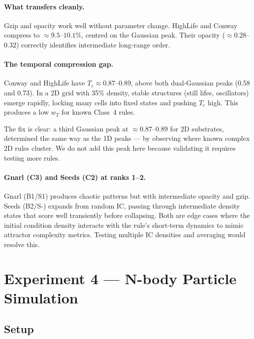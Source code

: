 \documentclass[12pt,a4paper]{article}
\begin{document}
\paragraph{What transfers cleanly.}
Gzip and opacity work well without parameter change.
HighLife and Conway compress to $\approx 9.5$--$10.1\%$, centred on the
Gaussian peak.
Their opacity ($\approx 0.28$--$0.32$) correctly identifies intermediate
long-range order.

\paragraph{The temporal compression gap.}
Conway and HighLife have $T_c \approx 0.87$--$0.89$, above both dual-Gaussian
peaks (0.58 and 0.73).
In a 2D grid with 35\% density, stable structures (still lifes, oscillators)
emerge rapidly, locking many cells into fixed states and pushing $T_c$ high.
This produces a low $w_T$ for known Class~4 rules.

The fix is clear: a third Gaussian peak at $\approx 0.87$--$0.89$ for 2D
substrates, determined the same way as the 1D peaks --- by observing where
known complex 2D rules cluster.
We do not add this peak here because validating it requires testing more rules.

\paragraph{Gnarl (C3) and Seeds (C2) at ranks 1--2.}
Gnarl (B1/S1) produces chaotic patterns but with intermediate opacity and gzip.
Seeds (B2/S-) expands from random IC, passing through intermediate density
states that score well transiently before collapsing.
Both are edge cases where the initial condition density interacts with the
rule's short-term dynamics to mimic attractor complexity metrics.
Testing multiple IC densities and averaging would resolve this.

\section{Experiment 4 --- N-body Particle Simulation}

\subsection{Setup}
\end{document}
